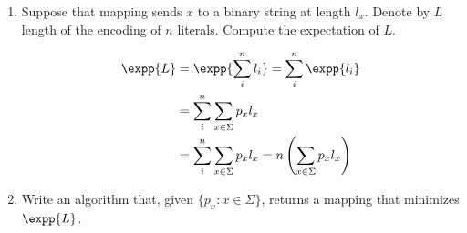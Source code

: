     \begin{enumerate}
      \item Suppose that mapping sends $x$ to a binary string at length $l_{x}$. Denote by $L$ length of the encoding of $n$ literals. Compute the expectation of $L$.
        
  
  \begin{equation*}
    \begin{split}
      \expp{L} &=  \expp{\sum_{i}^{n}l_{i}} = \sum_{i}^{n}\expp{l_{i}} \\ 
      & = \sum_{i}^{n}\sum_{x\in \Sigma}p_{x}l_{x}\\
    &= \sum_{i}^{n}\sum_{x\in \Sigma}p_{x}l_{x} = n \left( \sum_{x\in \Sigma}p_{x}l_{x} \right)
    \end{split}
  \end{equation*}

      \item Write an algorithm that, given $\{p_{x} : x \in \Sigma \}$, returns a mapping that minimizes $\expp{L}$.
    \end{enumerate}

